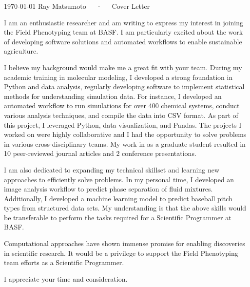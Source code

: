 \documentclass[11pt, a4paper]{awesome-cv}
\begin{document}
\makecvheader[R]

\makecvfooter
  {\today}
  {Ray Matsumoto~~~·~~~Cover Letter}
  {}

\makelettertitle

\begin{cvletter}

I am an enthusiastic researcher and am writing to express my interest in
    joining the Field Phenotyping team at BASF.  
    I am particularly excited about the work of developing software solutions
    and automated workflows to enable sustainable agriculture.

    I believe my background would make me a great fit with your team.  During my
    academic training in molecular modeling, I developed a strong foundation in
    Python and data analysis, regularly developing software to implement
    statistical methods for understanding simulation data.  
    For instance, I developed an automated workflow to run simulations for over 
    400 chemical systems, conduct various analysis techniques, and compile the data into CSV format.  
    As part of this project, I leveraged Python, data visualization, and Pandas.  
    The projects I worked on were highly collaborative and I had the opportunity
    to solve problems in various cross-disciplinary teams.
    My work in as a graduate student resulted in 10 peer-reviewed journal articles and 2
    conference presentations.

    I am also dedicated to expanding my technical skillset and learning new approaches to
    efficiently solve problems.  In my personal time, I developed an image
    analysis workflow to predict phase separation of fluid mixtures.
    Additionally, I developed a machine learning model to predict baseball
    pitch types from structured data sets.  My understanding is that the above
    skills would be transferable to perform the tasks required for a Scientific
    Programmer at BASF.

    Computational approaches have shown immense promise for enabling discoveries
    in scientific research.  It would be a privilege to support the
    Field Phenotyping team efforts as a Scientific Programmer.

    I appreciate your time and consideration.


\end{cvletter}


\makeletterclosing
\end{document}
